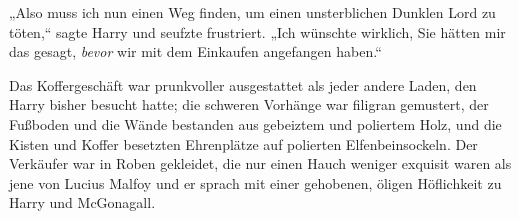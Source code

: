„Also muss ich nun einen Weg finden, um einen unsterblichen Dunklen Lord zu töten,“ sagte Harry und seufzte frustriert. „Ich wünschte wirklich, Sie hätten mir das gesagt, \emph{bevor} wir mit dem Einkaufen angefangen haben.“

\later

Das Koffergeschäft war prunkvoller ausgestattet als jeder andere Laden, den Harry bisher besucht hatte; die schweren Vorhänge war filigran gemustert, der Fußboden und die Wände bestanden aus gebeiztem und poliertem Holz, und die Kisten und Koffer besetzten Ehrenplätze auf polierten Elfenbeinsockeln. Der Verkäufer war in Roben gekleidet, die nur einen Hauch weniger exquisit waren als jene von Lucius Malfoy und er sprach mit einer gehobenen, öligen Höflichkeit zu Harry und McGonagall.

